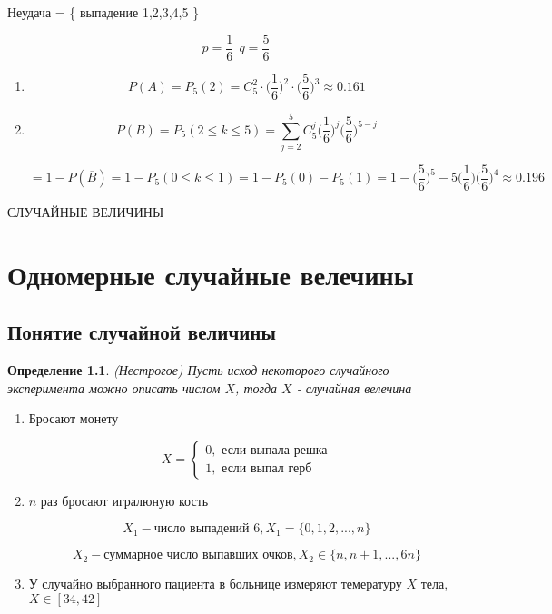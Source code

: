\documentclass[a4paper, 14pt]{report}
\newtheorem{defenition}{Определение}[chapter]
\begin{document}
Неудача = \{ выпадение 1,2,3,4,5 \}

$$
p = \frac{1}{6}\ \ q = \frac{5}{6}
$$

\begin{enumerate}
    \item
        $$
        P(A) = P_5(2) = C_5^2 \cdot \bigg(\frac{1}{6}\bigg)^2 \cdot \bigg(\frac{5}{6}\bigg)^3 \approx 0.161
        $$

    \item

        $$
        P(B) = P_5(2 \le k \le 5) = \sum_{j=2}^5 C_5^j \bigg(\frac{1}{6}\bigg)^j \bigg(\frac{5}{6}\bigg)^{5-j}
        $$

        $$
        = 1 - P(\overline B) = 1 - P_5(0 \le k \le 1) = 1 - P_5(0) - P_5(1) = 1 - \bigg(\frac{5}{6}\bigg)^5 - 5 \bigg(\frac{1}{6} \bigg) \bigg(\frac{5}{6}\bigg)^4 \approx 0.196
        $$
\end{enumerate}

СЛУЧАЙНЫЕ ВЕЛИЧИНЫ

\chapter{Одномерные случайные велечины}

\section{Понятие случайной величины}

\begin{defenition}
    (Нестрогое) Пусть исход некоторого случайного эксперимента можно описать числом $X$, тогда $X$ - случайная велечина
\end{defenition}

\begin{enumerate}
    \item Бросают монету

        $$
        X =
        \begin{cases}
            0, \text{ если выпала решка} \\
            1, \text{ если выпал герб}
        \end{cases}
        $$

    \item $n$ раз бросают игралюную кость

        $$
        X_1 - \text{число выпадений 6}, X_1 = \{0,1,2,...,n\}
        $$

        $$
        X_2 - \text{суммарное число выпавших очков}, X_2 \in \{n, n+1, ..., 6n\}
        $$

    \item У случайно выбранного пациента в больнице измеряют темературу $X$ тела, $X \in [34,42]$
\end{enumerate}
\end{document}
